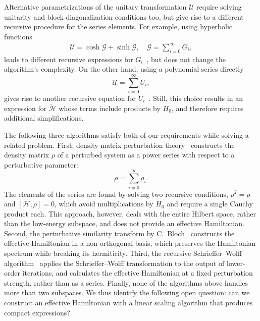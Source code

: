 Alternative parametrizations of the unitary transformation $\mathcal{U}$ require solving unitarity and block diagonalization conditions too, but give rise to a different recursive procedure for the series elements.
For example, using hyperbolic functions
%
\begin{gather}
\mathcal{U} = \cosh{\mathcal{G}} + \sinh{\mathcal{G}}, \quad
\mathcal{G} = \sum_{i=0}^{\infty} G_i,
\end{gather}
%
leads to different recursive expressions for $G_i$~\cite{Shavitt_1980}, but does not change the algorithm's complexity.
On the other hand, using a polynomial series directly
%
\begin{equation}
\mathcal{U} = \sum_{i=0}^{\infty} U_i,
\end{equation}
%
gives rise to another recursive equation for $U_i$~\cite{Van_Vleck_1929, Lowdin_1962, Klein_1974, Suzuki_1983}.
Still, this choice results in an expression for $\tilde{\mathcal{H}}$ whose terms include products by $H_0$, and therefore requires additional simplifications.

The following three algorithms satisfy both of our requirements while solving a related problem.
First, density matrix perturbation theory~\cite{McWeeny_1962,McWeeny_1968,Truflandier_2020} constructs the density
matrix $\mathcal{\rho}$ of a perturbed system as a power series with respect to a perturbative parameter:
%
\begin{equation}
  \mathcal{\rho} = \sum_{i=0}^{\infty} \rho_i.
\end{equation}
%
The elements of the series are found by solving two recursive conditions, $\mathcal{\rho}^2 = \mathcal{\rho}$ and $[\mathcal{H}, \mathcal{\rho}]=0$, which avoid multiplications by $H_0$ and require a single Cauchy product each.
This approach, however, deals with the entire Hilbert space, rather than the low-energy subspace, and does not provide an effective Hamiltonian.
Second, the perturbative similarity transform by C.~Bloch~\cite{Bloch_1958,Bravyi_2011} constructs the effective Hamiltonian in a non-orthogonal basis, which preserves the Hamiltonian spectrum while breaking its hermiticity.
Third, the recursive Schrieffer--Wolff algorithm~\cite{Li_2022} applies the Schrieffer--Wolff transformation to the output of lower-order iterations, and calculates the effective Hamiltonian at a fixed perturbation strength, rather
than as a series.
Finally, none of the algorithms above handles more than two subspaces.
We thus identify the following open question: can we construct an effective Hamiltonian with a linear scaling algorithm that produces compact expressions?


